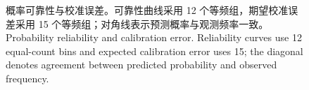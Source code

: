 \fi
\begin{figure}[htbp]\centering{}
\caption{\ifzh
概率可靠性与校准误差。可靠性曲线采用 12 个等频组，期望校准误差采用 15 个等频组；对角线表示预测概率与观测频率一致。
\else
Probability reliability and calibration error. Reliability curves use 12 equal-count bins and expected calibration error uses 15; the diagonal denotes agreement between predicted probability and observed frequency.
\fi}\label{fig:calib}
\end{figure}
\FloatBarrier
